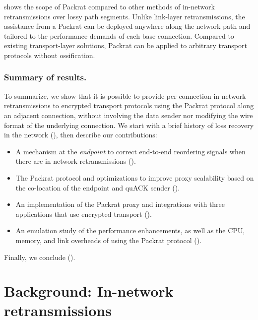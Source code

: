 

\noindent {} shows the scope of Packrat compared
to other methods of in-network retransmissions over lossy path segments.
Unlike link-layer retransmissions, the assistance from a Packrat can be
deployed anywhere along the network path and tailored to the performance
demands of each base connection. Compared to existing transport-layer
solutions, Packrat can be applied to arbitrary transport protocols without
ossification.

\subsubsection{Summary of results.}
To summarize, we show that it is possible to provide per-connection in-network
retransmissions to encrypted transport protocols using the Packrat protocol along
an adjacent connection, without involving the data sender nor modifying the
wire format of the underlying connection. We start with a brief history of loss
recovery in the network (), then describe our
contributions:

\begin{itemize}[noitemsep]
    \item A mechanism at the \textit{endpoint} to correct
     end-to-end reordering signals when there are in-network retransmissions
     ().
    \item The Packrat protocol and optimizations to improve proxy
     scalability based on the co-location of the endpoint and quACK sender
     ().
    \item An implementation of the Packrat proxy and integrations with three
     applications that use encrypted transport ().
    \item An emulation study of the performance enhancements, as well as the CPU,
     memory, and link overheads of using the Packrat protocol
     ().
\end{itemize}

\noindent Finally, we conclude ().

\section{Background: In-network retransmissions}
\label{sec:packrat:background}

